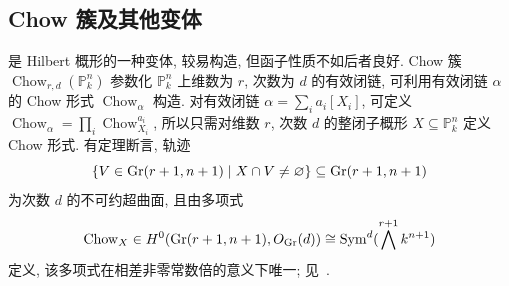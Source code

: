 \subsection{Chow 簇及其他变体}\label{src:2.4.5-subsection}
是 Hilbert 概形的一种变体, 较易构造, 但函子性质不如后者良好.
Chow 簇 $\operatorname{Chow}_{r,d}(\mathbb P_k^n)$ 参数化 $\mathbb P_k^n$ 上维数为 $r$, 次数为 $d$ 的有效闭链, 可利用有效闭链 $\alpha$ 的 Chow 形式 $\operatorname{Chow}_\alpha$ 构造.
对有效闭链 $\alpha=\sum_i a_i[X_i]$, 可定义
$\operatorname{Chow}_\alpha=\prod_i\operatorname{Chow}_{X_i}^{a_i}$, 
所以只需对维数 $r$, 次数 $d$ 的整闭子概形 $X\subseteq\mathbb P_k^n$ 定义 Chow 形式.
有定理断言, 轨迹
\begin{equation}\label{src:2.4.11}
\{V\in\operatorname{Gr}(r+1,n+1)\mid X\cap V\neq\varnothing\}
\subseteq\operatorname{Gr}(r+1,n+1)
\end{equation}
为次数 $d$ 的不可约超曲面, 且由多项式
\[
\operatorname{Chow}_X\in
H^0(\operatorname{Gr}(r+1,n+1),O_{\operatorname{Gr}}(d))
\cong\operatorname{Sym}^d(\bigwedge^{r+1}k^{n+1})
\]
定义, 该多项式在相差非零常数倍的意义下唯一; 见~\cite[\S$3$, 命题 $2.1$--$2.2$]{GKZ08}.

